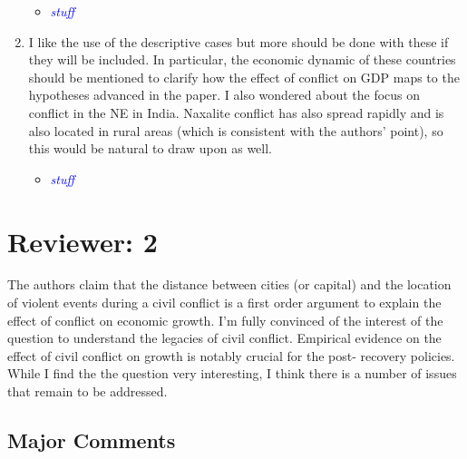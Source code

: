 \documentclass[12pt,onesided,fullpage]{amsart}
\begin{document}
\begin{enumerate}
\begin{itemize}
\item \textcolor{blue}{\emph{stuff}}
\end{itemize}

\item I like the use of the descriptive cases but more should be done with these if they will be included. In particular, the economic dynamic of these countries should be mentioned to clarify how the effect of conflict on GDP maps to the hypotheses advanced in the paper. I also wondered about the focus on conflict in the NE in India. Naxalite conflict has also spread rapidly and is also located in rural areas (which is consistent with the authors’ point), so this would be natural to draw upon as well.

\begin{itemize}
\item \textcolor{blue}{\emph{stuff}}
\end{itemize}

\end{enumerate}

\section{Reviewer: 2}
The authors claim that the distance between cities (or capital) and the location of violent events during a civil conflict is a first order argument to explain the effect of conflict on economic growth. I’m fully convinced of the interest of the question to understand the legacies of civil conflict. Empirical evidence on the effect of civil conflict on growth is notably crucial for the post- recovery policies. While I find the the question very interesting, I think there is a number of issues that remain to be addressed.

\subsection{Major Comments}
\end{document}
